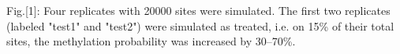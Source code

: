 Fig.[1]: Four replicates with 20000 sites were simulated. The first two replicates (labeled "test1" and "test2") were simulated as treated, i.e. on 15\% of their total sites, the methylation probability was increased by 30--70\%.
  